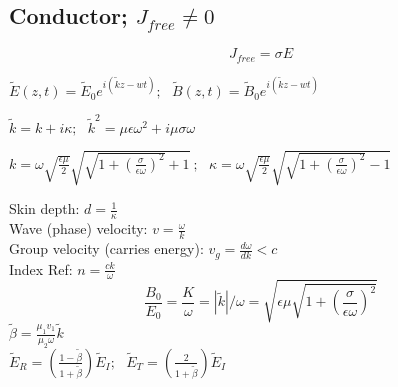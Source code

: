 \documentclass[12pt]{article}
\begin{document}
\newpage
\subsection{Conductor; $J_{free} \neq 0$}

\[J_{free} = \sigma E\]

\vspace{10pt}
$\tilde E(z,t) = \tilde E_0 e^{ i(\tilde k z - wt) }; \ \ \ \tilde B(z,t) = \tilde B_0 e^{ i(\tilde k z - wt) }$

\vspace{10pt}
$\tilde k = k + i\kappa; \ \ \ \tilde k^2 = \mu \epsilon \omega^2 + i\mu \sigma \omega$

\vspace{10pt}
$k = \omega \displaystyle \sqrt{ \frac{\epsilon \mu}{2} } 
	\sqrt{ \sqrt{1 + \left( \frac{\sigma}{\epsilon \omega} \right)^2} +1}\ ; \ \ \ \kappa = \omega 
	\sqrt{ \frac{\epsilon \mu}{2} } 
	\sqrt{ \sqrt{1 + \left( \frac{\sigma}{\epsilon \omega} \right)^2} - 1}$

\vspace{20pt}\noindent
Skin depth: $d = \displaystyle \frac{1}{\kappa}$ \\
Wave (phase) velocity: $v = \displaystyle \frac{\omega}{k}$ \\
Group velocity (carries energy): $v_g = \frac{d\omega}{dk} < c$ \\
Index Ref: $n = \displaystyle \frac{ck}{\omega}$
\[\frac{B_0}{E_0} = \frac{K}{\omega} = |\tilde k|/\omega 
	= \sqrt{\epsilon \mu \sqrt{1 + \left( \frac{\sigma}{\epsilon \omega} \right)^2 } }\] 
$\tilde \beta =\displaystyle \frac{\mu_1 v_1}{\mu_2 \omega} \tilde k$ \\[10pt]
$\tilde E_R = \left( \displaystyle \frac{1-\tilde \beta}{1+\tilde \beta} \right) \tilde E_I;\ \ \ 
	\tilde E_T = \left( \displaystyle \frac{2}{1+\tilde\beta} \right) \tilde E_I$

\newpage
\end{document}
